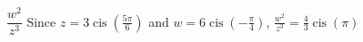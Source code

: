 { $\dfrac{w^2}{z^3}$ }
{ Since $z = 3\operatorname{cis}\left(\frac{5\pi}{6}\right)$ and $w = 6\operatorname{cis}\left(-\frac{\pi}{4}\right)$,  $\frac{w^2}{z^3} =\frac{4}{3}\operatorname{cis}(\pi)$}
